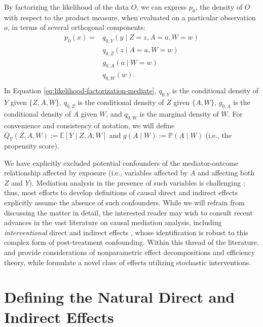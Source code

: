 \documentclass[
  12pt, krantz2,
]{krantz}
\renewcommand{\P}{\mathbb{P}}
\newcommand{\E}{\mathbb{E}}
\newcommand{\1}{\mathbbm{1}}
\theoremstyle{definition}
\theoremstyle{definition}
\theoremstyle{definition}
\theoremstyle{definition}
\theoremstyle{remark}
\begin{document}
By factorizing the likelihood of the data \(O\), we can express \(p_0\), the
density of \(O\) with respect to the product measure, when evaluated on a
particular observation \(o\), in terms of several orthogonal components:
\begin{align}
  p_0(x) = &q_{0,Y}(y \mid Z = z, A = a, W = w) \\ \nonumber
    &q_{0,Z}(z \mid A = a, W = w) \\ \nonumber
    &g_{0,A}(a \mid W = w) \\ \nonumber
    &q_{0,W}(w).\\ \nonumber
  \label{eq:likelihood-factorization-mediate}
\end{align}
In Equation \eqref{eq:likelihood-factorization-mediate}, \(q_{0, Y}\) is the
conditional density of \(Y\) given \(\{Z, A, W\}\), \(q_{0, Z}\) is the conditional
density of \(Z\) given \(\{A, W\}\), \(g_{0, A}\) is the conditional density of \(A\)
given \(W\), and \(q_{0, W}\) is the marginal density of \(W\). For convenience and
consistency of notation, we will define \(\overline{Q}_Y(Z, A, W) := \E[Y \mid Z, A, W]\) and \(g(A \mid W) := \P(A \mid W)\) (i.e., the propensity score).

We have explicitly excluded potential confounders of the mediator-outcome
relationship affected by exposure (i.e., variables affected by \(A\) and affecting
both \(Z\) and \(Y\)). Mediation analysis in the presence of such variables is
challenging \citep{avin2005identifiability}; thus, most efforts to develop
definitions of causal direct and indirect effects explicitly assume the absence
of such confounders. While we will refrain from discussing the matter in detail,
the interested reader may wish to consult recent advances in the vast literature
on causal mediation analysis, including \emph{interventional} direct and indirect
effects \citep{didelez2006direct, vanderweele2014effect, lok2016defining, vansteelandt2017interventional, rudolph2017robust, nguyen2019clarifying},
whose identification is robust to this complex form of post-treatment
confounding. Within this thread of the literature, \citet{diaz2020nonparametric} and
\citet{benkeser2020nonparametric} provide considerations of nonparametric effect
decompositions and efficiency theory, while \citet{hejazi2021nonparametric} formulate a
novel class of effects utilizing stochastic interventions.

\hypertarget{defining-the-natural-direct-and-indirect-effects}{%
\section{Defining the Natural Direct and Indirect Effects}\label{defining-the-natural-direct-and-indirect-effects}}
\end{document}
